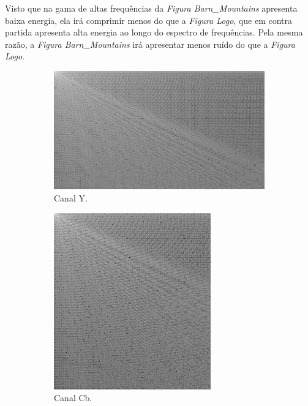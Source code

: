 \documentclass[a4paper, 12pt]{article}
\begin{document}
        Visto que na gama de altas frequências da \emph{Figura Barn\_Mountains} apresenta baixa energia,
        ela irá comprimir menos do que a \emph{Figura Logo}, que em contra partida apresenta alta energia ao
        longo do espectro de frequências.
        Pela mesma razão, a \emph{Figura Barn\_Mountains} irá apresentar menos ruído do que a 
        \emph{Figura Logo}.
        \begin{figure}[H]
            \begin{subfigure}{0.3\textwidth}
                \centering
                \includegraphics[width=\textwidth]{resources/DCT/Ydct_logo.png}
                \caption{ Canal Y.}
            \end{subfigure}
            \hfill
            \begin{subfigure}{0.3\textwidth}
                \centering 
                \includegraphics[scale=0.5]{resources/DCT/CBdct_logo.png}
                \caption{ Canal Cb.}
            \end{subfigure}
            \hfill
            \begin{subfigure}{0.3\textwidth}

\end{subfigure}
\end{figure}
\end{document}
